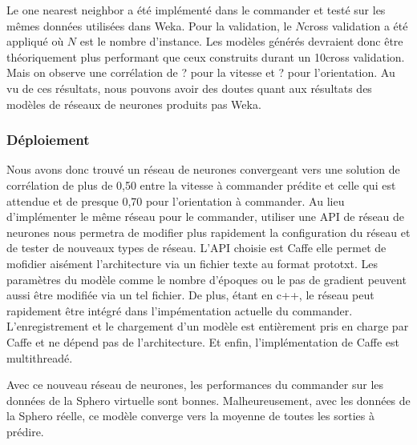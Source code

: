 Le one nearest neighbor a été implémenté dans le commander et testé sur les mêmes données utilisées dans Weka.
Pour la validation, le $N$cross validation a été appliqué où $N$ est le nombre d'instance.
Les modèles générés devraient donc être théoriquement plus performant que ceux construits durant un 10cross validation.
Mais on observe une corrélation de ? pour la vitesse et ? pour l'orientation.
Au vu de ces résultats, nous pouvons avoir des doutes quant aux résultats des modèles de réseaux de neurones produits pas Weka.

\subsubsection{Déploiement}
Nous avons donc trouvé un réseau de neurones convergeant vers une solution de corrélation de plus de 0,50 entre la vitesse à commander prédite et celle qui est attendue et de presque 0,70 pour l'orientation à commander.
Au lieu d'implémenter le même réseau pour le commander, utiliser une API de réseau de neurones nous permetra de modifier plus rapidement la configuration du réseau et de tester de nouveaux types de réseau.
L'API choisie est Caffe elle permet de mofidier aisément l'architecture via un fichier texte au format prototxt.\cite{caffe}
Les paramètres du modèle comme le nombre d'époques ou le pas de gradient peuvent aussi être modifiée via un tel fichier.
De plus, étant en c++, le réseau peut rapidement être intégré dans l'impémentation actuelle du commander.
L'enregistrement et le chargement d'un modèle est entièrement pris en charge par Caffe et ne dépend pas de l'architecture.
Et enfin, l'implémentation de Caffe est multithreadé.

Avec ce nouveau réseau de neurones, les performances du commander sur les données de la Sphero virtuelle sont bonnes. %
Malheureusement, avec les données de la Sphero réelle, ce modèle converge vers la moyenne de toutes les sorties à prédire. %